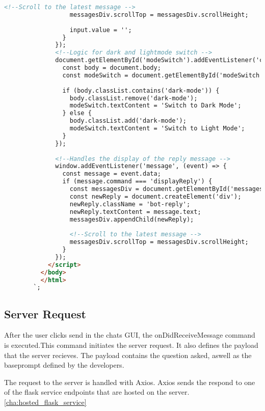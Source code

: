 \begin{lstlisting}[language=HTML, caption={IDE Chat GUI}]
                  <!--Scroll to the latest message -->
                  messagesDiv.scrollTop = messagesDiv.scrollHeight;
      
                  input.value = '';
                }
              });
              <!--Logic for dark and lightmode switch -->
              document.getElementById('modeSwitch').addEventListener('click', () => {
                const body = document.body;
                const modeSwitch = document.getElementById('modeSwitch');
      
                if (body.classList.contains('dark-mode')) {
                  body.classList.remove('dark-mode');
                  modeSwitch.textContent = 'Switch to Dark Mode';
                } else {
                  body.classList.add('dark-mode');
                  modeSwitch.textContent = 'Switch to Light Mode';
                }
              });
      
              <!--Handles the display of the reply message -->
              window.addEventListener('message', (event) => {
                const message = event.data;
                if (message.command === 'displayReply') {
                  const messagesDiv = document.getElementById('messages');
                  const newReply = document.createElement('div');
                  newReply.className = 'bot-reply';
                  newReply.textContent = message.text;
                  messagesDiv.appendChild(newReply);
      
                  <!--Scroll to the latest message -->
                  messagesDiv.scrollTop = messagesDiv.scrollHeight;
                }
              });
            </script>
          </body>
          </html>
        `;
\end{lstlisting}



\subsection{Server Request}

After the user clicks send in the chats GUI, the onDidReceiveMessage command is executed.This command initiates the server request.
It also defines the payload that the server recieves. The payload contains the question asked, aswell as the baseprompt defined by the developers. 

The request to the server is handled with Axios. Axios sends the respond to one of the flask service endpoints that are hosted on the server.
\ref{cha:hosted_flask_service}

